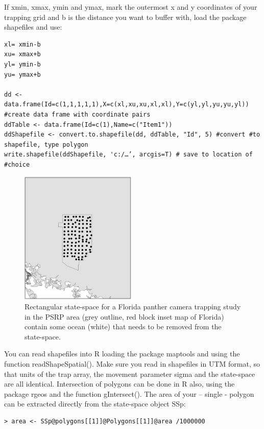If xmin, xmax, ymin and ymax, mark the outermost x and y coordinates of your trapping grid and b is the distance you want to buffer with, load the package shapefiles \citep{stabler:2006} and use:
\begin{verbatim}
xl= xmin-b
xu= xmax+b
yl= ymin-b
yu= ymax+b

dd <- data.frame(Id=c(1,1,1,1,1),X=c(xl,xu,xu,xl,xl),Y=c(yl,yl,yu,yu,yl)) #create data frame with coordinate pairs
ddTable <- data.frame(Id=c(1),Name=c("Item1"))
ddShapefile <- convert.to.shapefile(dd, ddTable, "Id", 5) #convert #to shapefile, type polygon
write.shapefile(ddShapefile, 'c:/…’, arcgis=T) # save to location of #choice
\end{verbatim}


\begin{figure}
\begin{center}
\includegraphics[height=2.5in]{Ch6/figs/panthercamera}
\end{center}
\caption{Rectangular state-space for a Florida panther camera trapping
study in the PSRP area (grey outline, red block inset map of Florida)
contain some ocean (white) that needs to be removed from the state-space.}
\label{pantercamera.fig}
\end{figure}

You can read shapefiles into R loading the package maptools
\citep{lewin-koh_etal:2011} and using the function
readShapeSpatial(). Make sure you read in shapefiles in UTM format, so
that units of the trap array, the movement parameter sigma and the
state-space are all identical.  Intersection of polygons can be done
in R also, using the package rgeos \citep{bivand_rundel:2011} and the
function gIntersect(). The area of your – single - polygon can be
extracted directly from the state-space object SSp:

\begin{verbatim}
> area <- SSp@polygons[[1]]@Polygons[[1]]@area /1000000
\end{verbatim}

